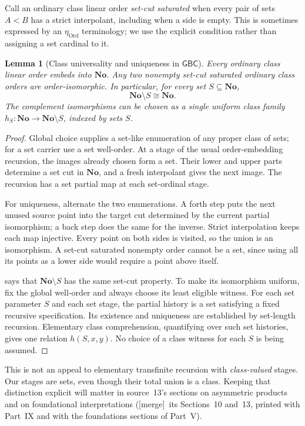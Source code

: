 \documentclass[11pt]{article}
\newtheorem{lemma}[lemma]{Lemma}
\theoremstyle{definition}
\theoremstyle{remark}
\newcommand{\No}{\mathbf{No}}
\newcommand{\Ord}{\mathrm{Ord}}
\newcommand{\GBC}{\mathsf{GBC}}
\newcommand{\merge}{\textsf{[merge]}}
\begin{document}
Call an ordinary class linear order \emph{set-cut saturated} when every
pair of sets $A<B$ has a strict interpolant, including when a side is
empty. This is sometimes expressed by an $\eta_{\Ord}$ terminology; we
use the explicit condition rather than assigning a set cardinal to it.

\begin{lemma}[Class universality and uniqueness in $\GBC$]\label{swo:fs:lem:backforth}
Every ordinary class linear order embeds into $\No$. Any two nonempty
set-cut saturated ordinary class orders are order-isomorphic. In
particular, for every set $S\subseteq\No$,
\[
                    \No\setminus S\cong\No.
\]
The complement isomorphisms can be chosen as a single uniform class
family $h_S:\No\to\No\setminus S$, indexed by sets $S$.
\end{lemma}
\begin{proof}
Global choice supplies a set-like enumeration of any proper class of
sets; for a set carrier use a set well-order. At a stage of the usual
order-embedding recursion, the images already chosen form a set. Their
lower and upper parts determine a set cut in $\No$, and a fresh
interpolant gives the next image. The recursion has a set partial map
at each set-ordinal stage.

For uniqueness, alternate the two enumerations. A forth step puts the
next unused source point into the target cut determined by the current
partial isomorphism; a back step does the same for the inverse. Strict
interpolation keeps each map injective. Every point on both sides is
visited, so the union is an isomorphism. A set-cut saturated nonempty
order cannot be a set, since using all its points as a lower side would
require a point above itself.

 says that $\No\setminus S$ has the same set-cut
property. To make its isomorphism uniform, fix the global well-order
and always choose its least eligible witness. For each set parameter
$S$ and each set stage, the partial history is a set satisfying a fixed
recursive specification. Its existence and uniqueness are established
by set-length recursion. Elementary class comprehension, quantifying
over such set histories, gives one relation $h(S,x,y)$. No choice of a
class witness for each $S$ is being assumed.
\end{proof}

This is not an appeal to elementary transfinite recursion with
\emph{class-valued} stages. Our stages are sets, even though their total
union is a class. Keeping that distinction explicit will matter in
source~13's sections on asymmetric products and on foundational
interpretations (\merge\ its Sections~10 and~13, printed with Part~IX and
with the foundations sections of Part~V).
\end{document}
